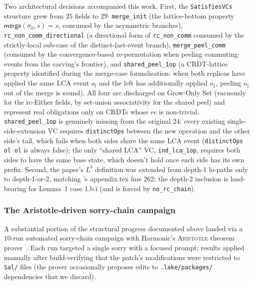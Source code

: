 \documentclass[11pt,a4paper]{article}
\theoremstyle{definition}
\theoremstyle{remark}
\newcommand{\mmerge}{\mathsf{merge}}
\newcommand{\init}{\sigma_0}
\begin{document}
Two architectural decisions accompanied this work. First, the
\texttt{SatisfiesVCs} structure grew from $25$ fields to $29$:
\texttt{merge\_init} (the lattice-bottom property
$\mmerge(\init, s) = s$, consumed by the asymmetric branches),
\texttt{rc\_non\_comm\_directional} (a directional form of
\texttt{rc\_non\_comm} consumed by the strictly-local sub-case of
the distinct-last-event branch), \texttt{merge\_peel\_comm}
(consumed by the convergence-based re-permutation when peeling
commuting events from the carving's frontier), and
\texttt{shared\_peel\_1op} (a CRDT-lattice property identified
during the merge-case formalisation: when both replicas have
applied the same LCA event $o_l$ and the left has additionally
applied $o_1$, peeling $o_1$ out of the merge is sound). All
four are discharged on Grow-Only Set (vacuously for the rc-Either
fields, by set-union associativity for the shared peel) and
represent real obligations only on CRDTs whose $\mathit{rc}$ is
non-trivial. \texttt{shared\_peel\_1op} is genuinely missing from
the original $24$: every existing single-side-extension VC
requires \texttt{distinctOps} between the new operation and the
other side's tail, which fails when both sides share the same LCA
event (\texttt{distinctOps ol ol} is always false); the only
``shared LCA'' VC, \texttt{ind\_lca\_1op}, requires both sides to
have the same base state, which doesn't hold once each side has
its own prefix.
Second, the paper's $L^b$ definition was extended from depth-1
lo-paths only to depth-1-or-2, matching
\cite{sal2025}'s appendix.tex line 262; the depth-2 inclusion is
load-bearing for Lemma~1 case 1.b.i (and is forced by
\texttt{no\_rc\_chain}).

\subsubsection{The Aristotle-driven sorry-chain campaign}
\label{sec:aristotle-campaign}

A substantial portion of the structural progress documented above
landed via a $10$-run automated sorry-chain campaign with Harmonic's
\textsc{Aristotle} theorem prover~\cite{harmonic-aristotle}. Each
run targeted a single sorry with a focused prompt; results applied
manually after build-verifying that the patch's modifications were
restricted to \texttt{Sal/} files (the prover occasionally proposes
edits to \texttt{.lake/packages/} dependencies that we discard).
\end{document}
